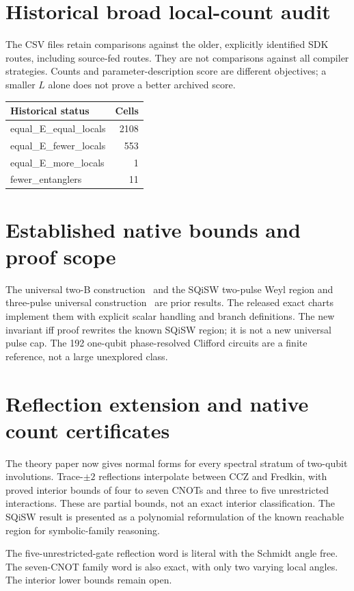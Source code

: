 \documentclass[11pt]{article}
\begin{document}
\section{Historical broad local-count audit}
The CSV files retain comparisons against the older, explicitly identified
SDK routes, including source-fed routes. They are not comparisons against
all compiler strategies. Counts and parameter-description score are different
objectives; a smaller $L$ alone does not prove a better archived score.
\begin{center}\begin{tabular}{lr}\toprule Historical status & Cells\\\midrule
equal\_E\_equal\_locals & 2108\\
equal\_E\_fewer\_locals & 553\\
equal\_E\_more\_locals & 1\\
fewer\_entanglers & 11\\
\bottomrule\end{tabular}\end{center}
\section{Established native bounds and proof scope}
The universal two-B construction~\cite{b} and the SQiSW two-pulse Weyl
region and three-pulse universal construction~\cite{sq} are prior results.
The released exact charts implement them with explicit scalar handling and
branch definitions. The new invariant iff proof rewrites the known SQiSW
region; it is not a new universal pulse cap. The 192 one-qubit phase-resolved
Clifford circuits are a finite reference, not a large unexplored class.
\section{Reflection extension and native count certificates}
The theory paper now gives normal forms for every spectral stratum of
two-qubit involutions. Trace-$\pm2$ reflections interpolate between CCZ
and Fredkin, with proved interior bounds of four to seven CNOTs and three
to five unrestricted interactions. These are partial bounds, not an exact
interior classification. The SQiSW result is presented as a polynomial
reformulation of the known reachable region for symbolic-family reasoning.

The five-unrestricted-gate reflection word is literal with the Schmidt angle
free. The seven-CNOT family word is also exact, with only two varying local
angles. The interior lower bounds remain open.
\end{document}

